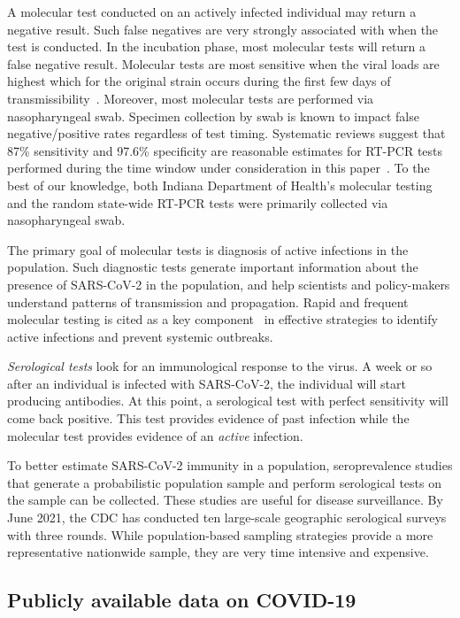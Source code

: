 \documentclass[11pt]{amsart}
\numberwithin{equation}{section}
\theoremstyle{plain}
\begin{document}
 A molecular test conducted on an actively infected individual may return a negative result.  Such false negatives are very strongly associated with when the test is conducted.  In the incubation phase, most molecular tests will return a false negative result.  Molecular tests are most sensitive when the viral loads are highest which for the original strain occurs during the first few days of transmissibility~\citep{Mina2020}.   Moreover, most molecular tests are performed via nasopharyngeal swab.  Specimen collection by swab is known to impact false negative/positive rates regardless of test timing.   Systematic reviews suggest that 87\% sensitivity and 97.6\% specificity are reasonable estimates for RT-PCR tests performed during the time window under consideration in this paper~\citep{Arevalo2020, Woloshin2020,Cohen2020}.  To the best of our knowledge, both Indiana Department of Health's molecular testing and the random state-wide RT-PCR tests were primarily collected via nasopharyngeal swab.

 The primary goal of molecular tests is diagnosis of active infections in the population.  Such diagnostic tests generate important information about the presence of SARS-CoV-2 in the population, and help scientists and policy-makers understand patterns of transmission and propagation. Rapid and frequent molecular testing is cited as a key component~\citep{OECD2021} in effective strategies to identify active infections and prevent systemic outbreaks.


\emph{Serological tests} look for an immunological response to the virus.  A week or so after an individual is infected with SARS-CoV-2, the individual will start producing antibodies.  At this point, a serological test with perfect sensitivity will come back positive.  This test provides evidence of past infection while the molecular test provides evidence of an \emph{active} infection.

To better estimate SARS-CoV-2 immunity in a population, seroprevalence studies that generate a probabilistic population sample and perform serological tests on the sample can be collected.  These studies are useful for disease surveillance. By June 2021, the CDC has conducted ten large-scale geographic serological surveys with three rounds.  While population-based sampling strategies provide a more representative nationwide sample, they are very time intensive and expensive.

 \subsection{Publicly available data on COVID-19}
 \label{subsection:testinginfo}
\end{document}
